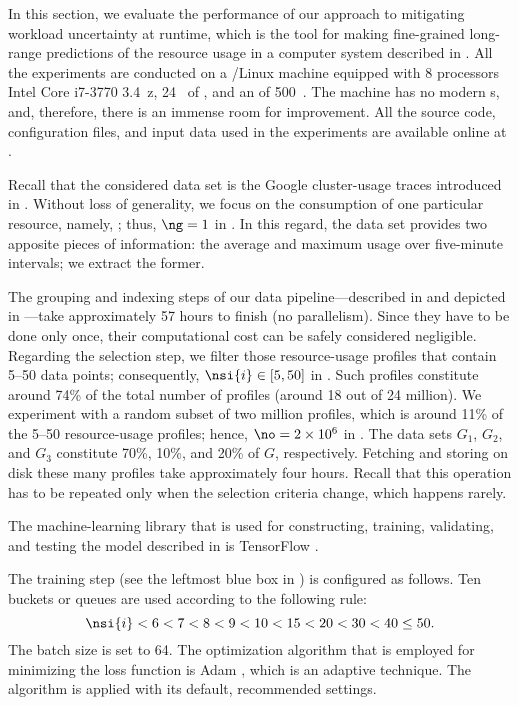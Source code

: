 In this section, we evaluate the performance of our approach to mitigating
workload uncertainty at runtime, which is the tool for making fine-grained
long-range predictions of the resource usage in a computer system described in
. All the experiments are conducted on a /Linux
machine equipped with 8 processors Intel Core i7-3770 3.4~z, 24~
of , and an  of 500~. The machine has no modern
s, and, therefore, there is an immense room for improvement. All the
source code, configuration files, and input data used in the experiments are
available online at \cite{eslab2017b}.


Recall that the considered data set is the Google cluster-usage traces
\cite{reiss2011} introduced in . Without loss of generality,
we focus on the consumption of one particular resource, namely, ;
thus, $\ng = 1$ in . In this regard, the data set provides
two apposite pieces of information: the average and maximum  usage over
five-minute intervals; we extract the former.

The grouping and indexing steps of our data pipeline---described in
 and depicted in ---take approximately
57 hours to finish (no parallelism). Since they have to be done only once, their
computational cost can be safely considered negligible. Regarding the selection
step, we filter those resource-usage profiles that contain 5--50 data points;
consequently, $\nsi{i} \in [5, 50]$ in . Such profiles
constitute around 74\% of the total number of profiles (around 18 out of 24
million). We experiment with a random subset of two million profiles, which is
around 11\% of the 5--50 resource-usage profiles; hence, $\no = 2 \times 10^6$
in . The data sets $G_1$, $G_2$, and $G_3$ constitute
70\%, 10\%, and 20\% of $G$, respectively. Fetching and storing on disk these
many profiles take approximately four hours. Recall that this operation has to
be repeated only when the selection criteria change, which happens rarely.


The machine-learning library that is used for constructing, training,
validating, and testing the model described in  is
TensorFlow \cite{abadi2015}.

The training step (see the leftmost blue box in ) is
configured as follows. Ten buckets or queues are used according to the following
rule:
\[
  \nsi{i} < 6 < 7 < 8 < 9 < 10 < 15 < 20 < 30 < 40 \leq 50.
\]
The batch size \nb is set to 64. The optimization algorithm that is employed for
minimizing the loss function is Adam \cite{kingma2014}, which is an adaptive
technique. The algorithm is applied with its default, recommended settings.

